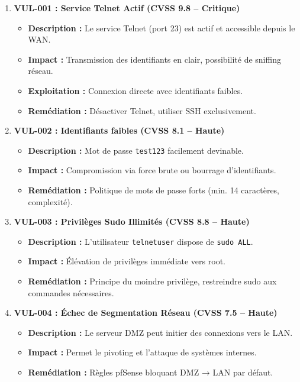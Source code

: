 \documentclass[12pt,a4paper,openany]{report}
\begin{document}
	\begin{enumerate}
		\item \textbf{VUL-001 : Service Telnet Actif (CVSS 9.8 -- Critique)}
		\begin{itemize}
			\item \textbf{Description :} Le service Telnet (port 23) est actif et accessible depuis le WAN.
			\item \textbf{Impact :} Transmission des identifiants en clair, possibilité de sniffing réseau.
			\item \textbf{Exploitation :} Connexion directe avec identifiants faibles.
			\item \textbf{Remédiation :} Désactiver Telnet, utiliser SSH exclusivement.
		\end{itemize}
		
		\item \textbf{VUL-002 : Identifiants faibles (CVSS 8.1 -- Haute)}
		\begin{itemize}
			\item \textbf{Description :} Mot de passe \texttt{test123} facilement devinable.
			\item \textbf{Impact :} Compromission via force brute ou bourrage d'identifiants.
			\item \textbf{Remédiation :} Politique de mots de passe forts (min. 14 caractères, complexité).
		\end{itemize}
		
		\item \textbf{VUL-003 : Privilèges Sudo Illimités (CVSS 8.8 -- Haute)}
		\begin{itemize}
			\item \textbf{Description :} L'utilisateur \texttt{telnetuser} dispose de \texttt{sudo ALL}.
			\item \textbf{Impact :} Élévation de privilèges immédiate vers root.
			\item \textbf{Remédiation :} Principe du moindre privilège, restreindre sudo aux commandes nécessaires.
		\end{itemize}
		
		\item \textbf{VUL-004 : Échec de Segmentation Réseau (CVSS 7.5 -- Haute)}
		\begin{itemize}
			\item \textbf{Description :} Le serveur DMZ peut initier des connexions vers le LAN.
			\item \textbf{Impact :} Permet le pivoting et l'attaque de systèmes internes.
			\item \textbf{Remédiation :} Règles pfSense bloquant DMZ → LAN par défaut.
		\end{itemize}
	\end{enumerate}
	
\end{document}
